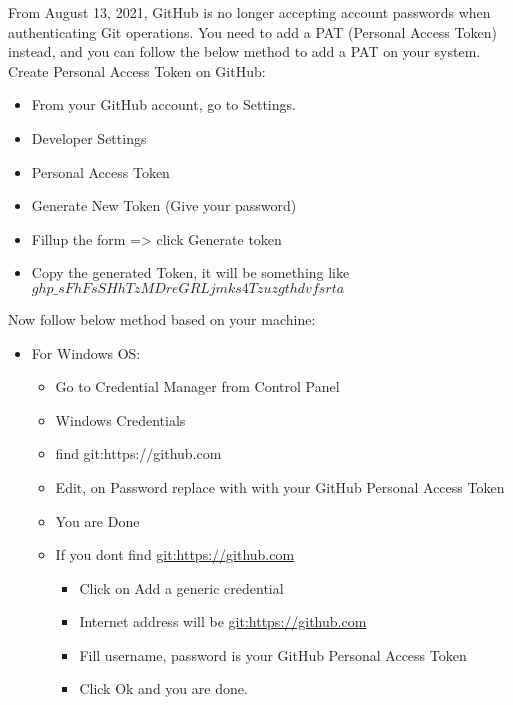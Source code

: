 From August 13, 2021, GitHub is no longer accepting account passwords 
when authenticating Git operations. 
You need to add a PAT (Personal Access Token) instead, 
and you can follow the below method to add a PAT on your system.\\
    Create Personal Access Token on GitHub:
    \begin{itemize}
        \item From your GitHub account, go to Settings.
        \item Developer Settings 
        \item Personal Access Token
        \item Generate New Token (Give your password)
        \item Fillup the form => click Generate token
        \item Copy the generated Token, it will be something like $ghp\_sFhFsSHhTzMDreGRLjmks4Tzuzgthdvfsrta$
    \end{itemize}
    Now follow below method based on your machine:
    \begin{itemize}
        \item For Windows OS:
        \begin{itemize}
            \item Go to Credential Manager from Control Panel
            \item Windows Credentials
            \item find git:https://github.com
            \item Edit, on Password replace with with your GitHub Personal Access Token
            \item You are Done
            \item If you dont find \url{git:https://github.com} 
            \begin{itemize}
                \item Click on Add a generic credential
                \item Internet address will be \url{git:https://github.com}
                \item Fill username, password is your GitHub Personal Access Token 
                \item Click Ok and you are done.
            \end{itemize} 
        \end{itemize}    
    \end{itemize}


